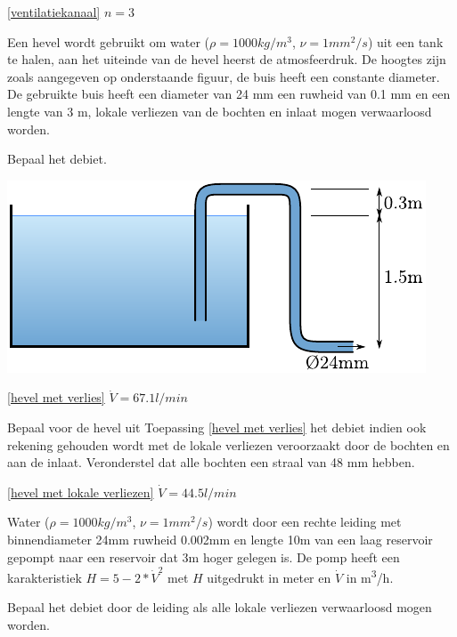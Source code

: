 \begin{antwoord}{\ref{ventilatiekanaal}}
	$n = 3$
\end{antwoord}
\begin{toepassing}
	\label{hevel met verlies}
Een hevel wordt gebruikt om water ($\rho=1000\unit{kg/m^3}$, $\nu=1\unit{mm^2/s}$) uit een tank te halen, aan het uiteinde van de hevel heerst de atmosfeerdruk. De hoogtes zijn zoals aangegeven op onderstaande figuur, de buis heeft een constante diameter. De gebruikte buis heeft een diameter van 24 mm een ruwheid van 0.1 mm en een lengte van 3 m, lokale verliezen van de bochten en inlaat mogen verwaarloosd worden.
		
Bepaal het debiet.

	\centering
	\includegraphics{fig/stroming_in_leidingen/hevel}
\end{toepassing}
\begin{antwoord}{\ref{hevel met verlies}}
	$\dot{V} = 67.1\unit{l/min}$
\end{antwoord}
\begin{toepassing}[*]
	\label{hevel met lokale verliezen}
Bepaal voor de hevel uit Toepassing \ref{hevel met verlies} het debiet indien ook rekening gehouden wordt met de lokale verliezen veroorzaakt door de bochten en aan de inlaat. Veronderstel dat alle bochten een straal van 48 mm hebben.

\end{toepassing}
\begin{antwoord}{\ref{hevel met lokale verliezen}}
	$\dot{V} = 44.5\unit{l/min}$
\end{antwoord}
\begin{toepassing}[*]
	\label{pompkarakteristiek}
Water ($\rho=1000\unit{kg/m^3}$, $\nu=1\unit{mm^2/s}$) wordt door een rechte leiding met binnendiameter 24mm ruwheid 0.002mm en lengte 10m van een laag reservoir gepompt naar een reservoir dat 3m hoger gelegen is. De pomp heeft een karakteristiek $H = 5 - 2*\dot{V}^2$ met $H$ uitgedrukt in meter en $\dot{V}$ in \unit{m^3/h}.

Bepaal het debiet door de leiding als alle lokale verliezen verwaarloosd mogen worden.
\end{toepassing}

